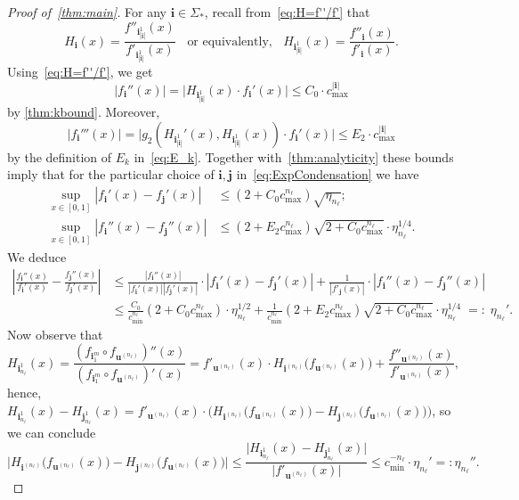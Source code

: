 \documentclass[11pt,]{article}
\def\cref#1{\ref{#1}}%
\theoremstyle{definition}
\theoremstyle{remark}
\newcommand{\0}{\mathbf{0}}
\newcommand{\bi}{\mathbf{i}}
\newcommand{\bj}{\mathbf{j}}
\newcommand{\bu}{\mathbf{u}}
\numberwithin{equation}{section}
\begin{document}
\begin{proof}[Proof of~\cref{thm:main}]
For any $\bi\in\Sigma_*$, recall from~\cref{eq:H=f''/f'} that
\begin{equation*}
	H_{\bi}(x)= \frac{f''_{\bi_{|\bi|}^1}(x)}{f'_{\bi_{|\bi|}^1}(x)} \;\;\text{ or equivalently,
	}\;\; H_{\bi_{|\bi|}^1}(x) = \frac{f''_{\bi}(x)}{f'_{\bi}(x)}.
\end{equation*}
Using~\eqref{eq:H=f''/f'}, we get 
\begin{equation*}
 |f_{\bi}''(x)| = \big|H_{\bi_{|\bi|}^1}(x)\cdot f_{\bi}'(x)\big|\leq C_0 \cdot c_{\max}^{|\bi|}
\end{equation*}
by \cref{thm:kbound}. Moreover,
\begin{equation*}
  |f_{\bi}'''(x)| = \big|g_2(H_{\bi_{|\bi|}^1}'(x),H_{\bi_{|\bi|}^1}(x))\cdot f_{\bi}'(x)\big| \leq
  E_2\cdot c_{\max}^{|\bi|}
\end{equation*}
by the definition of $E_k$ in~\cref{eq:E_k}. Together with~\cref{thm:analyticity} these bounds imply that
for the particular choice of $\bi,\bj$ in~\cref{eq:ExpCondensation} we have 
\begin{align*}
 \sup_{x\in[0,1]}|f_{\bi}'(x) - f_{\bj}'(x)| &\leq (2+C_0 c_{\max}^{n_\ell})\sqrt{\eta_{n_\ell}}; \\
 \sup_{x\in[0,1]}|f_{\bi}''(x) - f_{\bj}''(x)| &\leq (2+E_2c_{\max}^{n_\ell})\sqrt{2+C_0
 	c_{\max}^{n_\ell}}\cdot
 \eta_{n_\ell}^{1/4}.
\end{align*}
We deduce
\begin{align*}
	\left|\frac{f_{\bi}''(x)}{f_{\bi}'(x)} - \frac{f_{\bj}''(x)}{f_{\bj}'(x)}\right|
	&\leq
	\frac{|f_{\bi}''(x)|}{|f_{\bi}'(x)||f_{\bj}'(x)|}\cdot|f_{\bi}'(x) - f_{\bj}'(x)|
	+\frac{1}{|f'_{\bj}(x)|} \cdot |f_{\bi}''(x) - f_{\bj}''(x)|
	\\
	&
	\leq \frac{C_0}{c_{\min}^{n_\ell}}(2+C_0c_{\max}^{n_\ell})\cdot \eta_{n_\ell}^{1/2}
	+\frac{1}{c_{\min}^{n_\ell}}(2+E_2
	c_{\max}^{n_\ell})\sqrt{2+C_0 c_{\max}^{n_\ell}} \cdot \eta_{n_\ell}^{1/4} \;=:\;\eta_{n_\ell}'.
\end{align*}
Now observe that
\begin{equation*}
H_{\bi_{n_{\ell}}^1}(x) = \frac{(f_{\bi_1^m}\circ f_{\bu^{(n_{\ell})}})''(x)}{(f_{\bi_1^m}\circ
f_{\bu^{(n_{\ell})}})'(x)} = 
f'_{\bu^{(n_{\ell})}}(x) \cdot H_{\bi^{(n_{\ell})}} \big(f_{\bu^{(n_{\ell})}}(x)\big) + \frac{
f''_{\bu^{(n_{\ell})}}(x) }{ f'_{\bu^{(n_{\ell})}}(x)},
\end{equation*}
hence, $H_{\bi_{n_{\ell}}^1}(x)-H_{\bj_{n_{\ell}}^1}(x) = f'_{\bu^{(n_{\ell})}}(x) \cdot \big(
H_{\bi^{(n_{\ell})}} \big(f_{\bu^{(n_{\ell})}}(x)\big) -H_{\bj^{(n_{\ell})}}
\big(f_{\bu^{(n_{\ell})}}(x)\big) \big)$, so we can conclude
\[
\big| H_{\bi^{(n_{\ell})}} \big(f_{\bu^{(n_{\ell})}}(x)\big) -H_{\bj^{(n_{\ell})}}
\big(f_{\bu^{(n_{\ell})}}(x)\big) \big|
 \leq
 \frac{\big|H_{\bi_{n_{\ell}}^1}(x)-H_{\bj_{n_{\ell}}^1}(x)\big|}{\big|f'_{\bu^{(n_{\ell})}}(x)\big|}
 \leq c_{\min}^{-{n_\ell}}
\cdot \eta_{n_\ell}'
=:\eta_{n_\ell}''.
\]


\end{proof}
\end{document}
